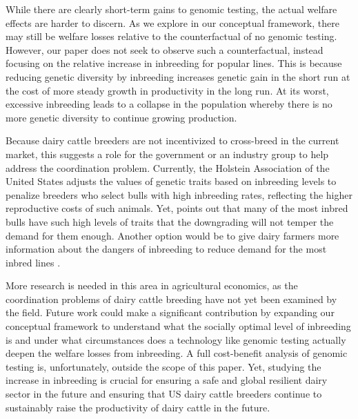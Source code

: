 \documentclass[12pt,letterpaper]{article}
\begin{document}
While there are clearly short-term gains to genomic testing, the actual welfare effects are harder to discern.
As we explore in our conceptual framework, there may still be welfare losses relative to the counterfactual of no genomic testing.
However, our paper does not seek to observe such a counterfactual, instead focusing on the relative increase in inbreeding for popular lines.
This is because reducing genetic diversity by inbreeding increases genetic gain in the short run at the cost of more steady growth in productivity in the long run.
At its worst, excessive inbreeding leads to a collapse in the population whereby there is no more genetic diversity to continue growing production.

Because dairy cattle breeders are not incentivized to cross-breed in the current market, this suggests a role for the government or an industry group to help address the coordination problem.
Currently, the Holstein Association of the United States adjusts the values of genetic traits based on inbreeding levels to penalize breeders who select bulls with high inbreeding rates, reflecting the higher reproductive costs of such animals. 
Yet, \citet{Cole2023} points out that many of the most inbred bulls have such high levels of traits that the downgrading will not temper the demand for them enough.
Another option would be to give dairy farmers more information about the dangers of inbreeding to reduce demand for the most inbred lines \citep{Cole2023}.

More research is needed in this area in agricultural economics, as the coordination problems of dairy cattle breeding have not yet been examined by the field.
Future work could make a significant contribution by expanding our conceptual framework to understand what the socially optimal level of inbreeding is and under what circumstances does a technology like genomic testing actually deepen the welfare losses from inbreeding.
A full cost-benefit analysis of genomic testing is, unfortunately, outside the scope of this paper.
Yet, studying the increase in inbreeding is crucial for ensuring a safe and global resilient dairy sector in the future and ensuring that US dairy cattle breeders continue to sustainably raise the productivity of dairy cattle in the future.
\end{document}
